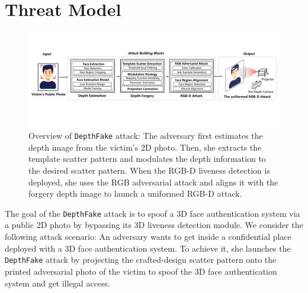
\section{Threat Model}


\begin{figure}[pt]
	\centerline{\includegraphics[width = \textwidth]{figures/overview.pdf}}
	\vspace{-0.1in}
	\caption{Overview of \texttt{DepthFake} attack: The adversary first estimates the depth image from the victim's 2D photo. Then, she extracts the template scatter pattern and modulates the depth information to the desired scatter pattern. When the RGB-D liveness detection is deployed, she uses the RGB adversarial attack and aligns it with the forgery depth image to launch a uniformed RGB-D attack.}
	\label{overview}
	\vspace{-0.15in}
\end{figure}

The goal of the \texttt{DepthFake} attack is to spoof a 3D face authentication system via a public 2D photo by bypassing its 3D liveness detection module. We consider the following attack scenario: An adversary wants to get inside a confidential place deployed with  a 3D face authentication system. To achieve it, she  launches the \texttt{DepthFake} attack by
projecting the crafted-design scatter pattern onto the printed adversarial photo of the victim to spoof the 3D face authentication system and get illegal access.
%
%


